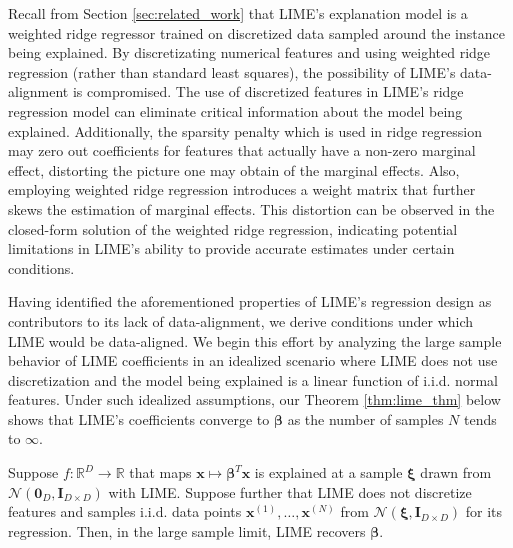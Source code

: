 \documentclass[mnsc,blindrev]{informs3}
\newcommand{\bI}{\mathbf{I}}
\begin{document}
             Recall from Section \ref{sec:related_work} that LIME's explanation model is a weighted ridge regressor trained on discretized data sampled around the instance being explained. By discretizating numerical features and using weighted ridge regression (rather than standard least squares), the possibility of LIME's data-alignment is compromised. The use of discretized features in LIME's ridge regression model can eliminate critical information about the model being explained. Additionally, the sparsity penalty which is used in ridge regression may zero out coefficients for features that actually have a non-zero marginal effect, distorting the picture one may obtain of the marginal effects. Also, employing weighted ridge regression introduces a weight matrix that further skews the estimation of marginal effects. This distortion can be observed in the closed-form solution of the weighted ridge regression, indicating potential limitations in LIME's ability to provide accurate estimates under certain conditions.
             
              Having identified the aforementioned properties of LIME's regression design as contributors to its lack of data-alignment, we derive conditions under which LIME would be data-aligned. We begin this effort by analyzing the large sample behavior of LIME coefficients in an idealized scenario where LIME does not use discretization and the model being explained is a linear function of i.i.d. normal features. Under such idealized assumptions, our Theorem \ref{thm:lime_thm} below shows that LIME's coefficients converge to $\boldsymbol{\beta}$ as the number of samples $N$ tends to $\infty$. %
            \begin{theorem}
                \label{thm:lime_thm}
                Suppose $f:\mathbb{R}^D\rightarrow \mathbb{R}$ that maps $\mathbf{x} \mapsto \boldsymbol{\beta}^T \mathbf{x}$ is explained at a sample $\boldsymbol{\xi}$ drawn from $\mathcal{N}(\mathbf{0}_D, \bI_{D\times D})$ with LIME. Suppose further that LIME does not discretize features and samples i.i.d. data points $\mathbf{x}^{(1)},\ldots,\mathbf{x}^{(N)}$ from $ \mathcal{N}(\boldsymbol{\xi}, \bI_{D\times D})$ for its regression.
                 Then, in the large sample limit, LIME recovers $\boldsymbol{\beta}$.  
            \end{theorem}
\end{document}
